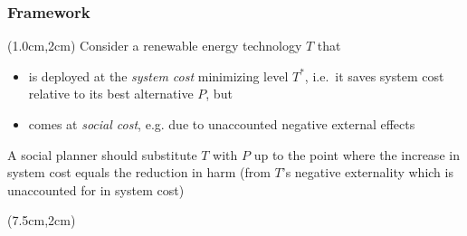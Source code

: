 \documentclass[aspectratio=1610, xcolor=dvipsnames,handout]{beamer} %
\begin{document}
    \begin{frame}
        \frametitle{Framework}

        \begin{textblock*}{5.75cm}
            (1.0cm,2cm)
            Consider a renewable energy technology $T$ that
            \begin{itemize}
                \item is deployed at the \emph{system cost} minimizing level $T^\ast$, i.e.\ it saves system cost
                relative to its best alternative $P$, but
                \item comes at \emph{social cost}, e.g. due to unaccounted negative external effects
            \end{itemize}
            \medskip

            A social planner should substitute $T$ with $P$ up to the point where the increase in system cost
            equals the reduction in harm (from $T$'s negative externality which is unaccounted for in system cost)
        \end{textblock*}

        \begin{textblock*}{7.5cm}
            (7.5cm,2cm)
        \end{textblock*}
    \end{frame}
\end{document}
